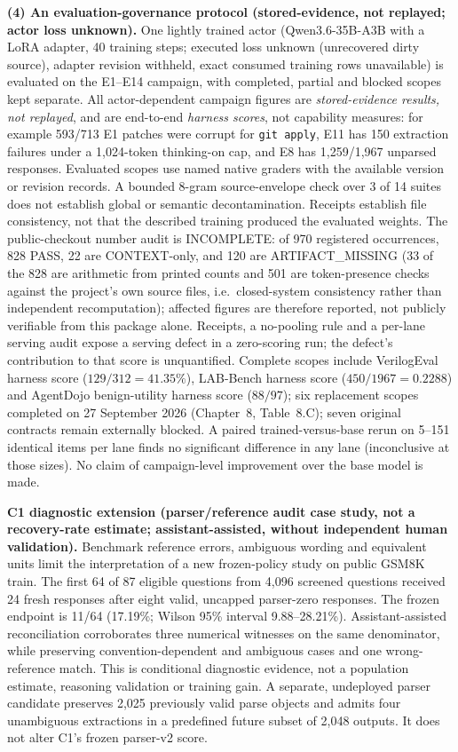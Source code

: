 \textbf{(4) An evaluation-governance protocol (stored-evidence, not
replayed; actor loss unknown).} One lightly trained actor
(Qwen3.6-35B-A3B with a LoRA adapter, 40 training steps; executed loss
unknown (unrecovered dirty source), adapter revision withheld, exact consumed
training rows unavailable) is evaluated on
the E1--E14 campaign, with completed, partial and blocked scopes kept separate.
All actor-dependent campaign figures are \emph{stored-evidence results, not
replayed}, and are end-to-end \emph{harness scores}, not capability measures:
for example 593/713 E1 patches were corrupt for \texttt{git apply}, E11 has
150 extraction failures under a 1,024-token thinking-on cap, and E8 has
1,259/1,967 unparsed responses. Evaluated scopes use named native graders with
the available version or revision records. A bounded 8-gram source-envelope
check over 3 of 14 suites does not establish global or semantic
decontamination. Receipts establish file consistency, not that the described
training produced the evaluated weights. The public-checkout number audit is
INCOMPLETE: of 970 registered occurrences, 828 PASS, 22 are CONTEXT-only, and
120 are ARTIFACT\_MISSING (33 of the 828 are arithmetic from printed counts and 501 are token-presence
checks against the project's own source files, i.e.\ closed-system consistency
rather than independent recomputation);
affected figures are therefore reported, not publicly verifiable from this
package alone. Receipts,
a no-pooling rule and a per-lane serving audit expose a serving defect in a
zero-scoring run; the defect's contribution to that score is unquantified.
Complete scopes include VerilogEval harness score
($129/312 = 41.35\%$), LAB-Bench harness score ($450/1967 = 0.2288$) and
AgentDojo benign-utility harness score
($88/97$); six replacement scopes completed on 27 September 2026
(Chapter~8, Table~8.C); seven original contracts remain externally blocked. A
paired trained-versus-base rerun on 5--151 identical items per lane finds no
significant difference in any lane (inconclusive at those sizes). No
claim of campaign-level improvement over the base model is made.


\textbf{C1 diagnostic extension (parser/reference audit case study, not a
recovery-rate estimate; assistant-assisted, without independent human
validation).} Benchmark reference errors, ambiguous wording and equivalent units limit the interpretation of a new frozen-policy study on public GSM8K train. The first 64 of 87 eligible questions from 4,096 screened questions received 24 fresh responses after eight valid, uncapped parser-zero responses. The frozen endpoint is 11/64 (17.19\%; Wilson 95\% interval 9.88--28.21\%). Assistant-assisted reconciliation corroborates three numerical witnesses on the same denominator, while preserving convention-dependent and ambiguous cases and one wrong-reference match. This is conditional diagnostic evidence, not a population estimate, reasoning validation or training gain. A separate, undeployed parser candidate preserves 2,025 previously valid parse objects and admits four unambiguous extractions in a predefined future subset of 2,048 outputs. It does not alter C1's frozen parser-v2 score.

